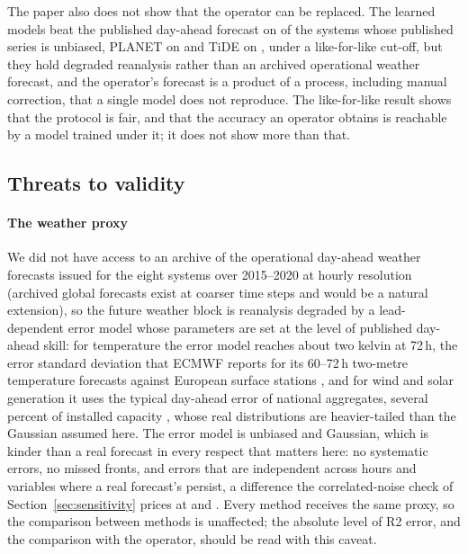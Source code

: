 The paper also does not show that the operator can be replaced. The learned models beat the
published day-ahead forecast on  of the
 systems whose published series is unbiased, PLANET on
 and TiDE on ,
under a like-for-like cut-off, but they hold degraded reanalysis rather than an archived
operational weather forecast, and the operator's forecast is a product of a process, including
manual correction, that a single model does not reproduce. The like-for-like result shows that
the protocol is fair, and that the accuracy an operator obtains is reachable by a model trained
under it; it does not show more than that.

\subsection{Threats to validity}
\paragraph{The weather proxy} We did not have access to an archive of the operational
day-ahead weather forecasts issued for the eight systems over 2015--2020 at hourly resolution
(archived global forecasts exist at coarser time steps and would be a natural extension), so
the future weather block is reanalysis degraded by a lead-dependent error model whose
parameters are set at the level of published day-ahead skill: for temperature the error
model reaches about two kelvin at 72\,h, the error standard deviation that ECMWF reports for
its 60--72\,h two-metre temperature forecasts against European surface stations
\cite{haiden2022ecmwf}, and for wind and solar generation it uses the typical day-ahead error
of national aggregates, several percent of installed capacity
\cite{hodge2012wind,lorenz2011pv}, whose real distributions are heavier-tailed than the
Gaussian assumed here. The error model is unbiased and Gaussian, which is kinder than a real forecast in every respect that matters here: no systematic
errors, no missed fronts, and errors that are independent across hours and variables where a
real forecast's persist, a difference the correlated-noise check of
Section~\ref{sec:sensitivity} prices at  and
. Every method receives
the same proxy, so the comparison between methods is unaffected; the absolute level of R2
error, and the comparison with the operator, should be read with this caveat.

